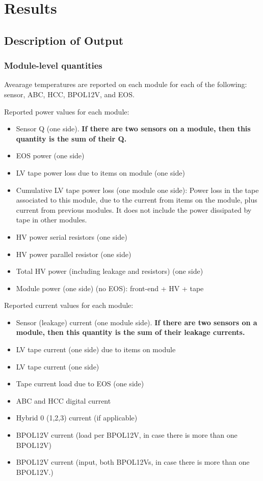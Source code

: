 
\newcommand{\mry}[2]{
\multirow{#1}{*}{Year #2}
}

\section{Results}
\label{results}

\subsection{Description of Output}
\label{description_of_output}
\subsubsection{Module-level quantities}
Avearage temperatures are reported on each module for each of the following: sensor, ABC, HCC, BPOL12V,
and EOS.

Reported power values for each module: 
\begin{itemize}
\setlength\itemsep{0.0em}
\item Sensor Q (one side). {\bf If there are two sensors on a module, then this quantity is the sum of
their Q.}
\item EOS power (one side)
\item LV tape power loss due to items on module (one side)
\item Cumulative LV tape power loss (one module one side):
Power loss in the tape associated to this module, due to the current from items on the module, plus
current from previous modules. It does not include the power dissipated by tape in other modules.
\item HV power serial resistors (one side)
\item HV power parallel resistor (one side)
\item Total HV power (including leakage and resistors) (one side)
\item Module power (one side) (no EOS): front-end + HV + tape
\end{itemize}

Reported current values for each module:
\begin{itemize}
\setlength\itemsep{0.0em}
\item Sensor (leakage) current (one module side). {\bf If there are two sensors on a module, then this
quantity is the sum of their leakage currents.}
\item LV tape current (one side) due to items on module
\item LV tape current (one side)
\item Tape current load due to EOS (one side)
\item ABC and HCC digital current
\item Hybrid 0 (1,2,3) current (if applicable)
\item BPOL12V current (load per BPOL12V, in case there is more than one BPOL12V)
\item BPOL12V current (input, both BPOL12Vs, in case there is more than one BPOL12V.)
\end{itemize}

